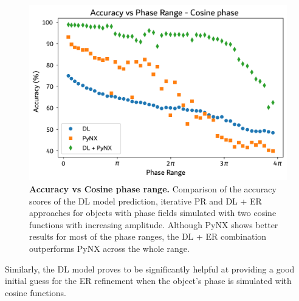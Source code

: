 \begin{figure}[H]
    \centering
    \includegraphics[width=\textwidth]{figures/Phasing/plot_acc_comparison_cosine_winter.pdf}
    \caption{\textbf{Accuracy vs Cosine phase range.} Comparison of the accuracy scores of the DL model prediction, 
    iterative PR and DL + ER approaches for objects with 
    phase fields simulated with two cosine functions with increasing amplitude. Although PyNX shows better results 
    for most of the phase ranges, the DL + ER combination outperforms PyNX across the whole range. }
    \label{fig:compare_cosine}
\end{figure}

Similarly, the DL model proves to be significantly helpful at providing a good initial guess for the ER refinement when 
the object's phase is simulated with cosine functions. 

